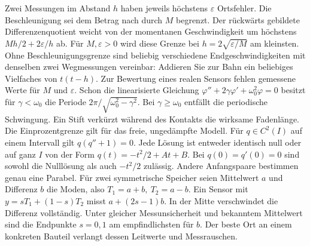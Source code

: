 Zwei Messungen im Abstand \(h\) haben jeweils höchstens \(\varepsilon\) Ortsfehler. Die Beschleunigung sei dem Betrag nach durch \(M\) begrenzt. Der rückwärts gebildete Differenzenquotient weicht von der momentanen Geschwindigkeit um höchstens \(Mh/2+2\varepsilon/h\) ab. Für \(M,\varepsilon>0\) wird diese Grenze bei \(h=2\sqrt{\varepsilon/M}\) am kleinsten. Ohne Beschleunigungsgrenze sind beliebig verschiedene Endgeschwindigkeiten mit denselben zwei Wegmessungen vereinbar: Addieren Sie zur Bahn ein beliebiges Vielfaches von \(t(t-h)\). Zur Bewertung eines realen Sensors fehlen gemessene Werte für \(M\) und \(\varepsilon\).
Schon die linearisierte Gleichung \(\varphi''+2\gamma\varphi'+\omega_0^2\varphi=0\) besitzt für \(\gamma<\omega_0\) die Periode \(2\pi/\sqrt{\omega_0^2-\gamma^2}\). Bei \(\gamma\ge\omega_0\) entfällt die periodische Schwingung. Ein Stift verkürzt während des Kontakts die wirksame Fadenlänge. Die Einprozentgrenze gilt für das freie, ungedämpfte Modell.
Für \(q\in C^2(I)\) auf einem Intervall gilt \(q(q''+1)=0\). Jede Lösung ist entweder identisch null oder auf ganz \(I\) von der Form \(q(t)=-t^2/2+At+B\).
Bei \(q(0)=q'(0)=0\) sind sowohl die Nulllösung als auch \(-t^2/2\) zulässig. Andere Anfangspaare bestimmen genau eine Parabel.
Für zwei symmetrische Speicher seien Mittelwert \(a\) und Differenz \(b\) die Moden, also \(T_1=a+b,\ T_2=a-b\). Ein Sensor mit \(y=sT_1+(1-s)T_2\) misst \(a+(2s-1)b\). In der Mitte verschwindet die Differenz vollständig. Unter gleicher Messunsicherheit und bekanntem Mittelwert sind die Endpunkte \(s=0,1\) am empfindlichsten für \(b\). Der beste Ort an einem konkreten Bauteil verlangt dessen Leitwerte und Messrauschen.

